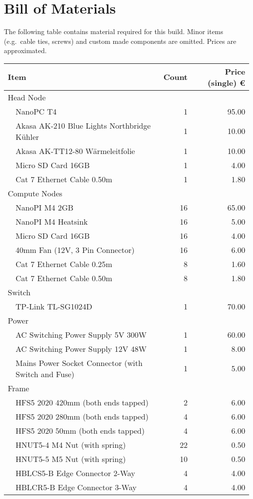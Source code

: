 \chapter{Bill of Materials}
\label{bom}

The following table contains material required for this build.
Minor items (e.g.\ cable ties, screws) and custom made components are omitted.
Prices are approximated.

\begin{center}
\begin{longtable}{llrr}
	\toprule
	\multicolumn{2}{l}{\textbf{Item}} & \textbf{Count} & \textbf{Price (single) €}\\

	\midrule
	\multicolumn{2}{l}{Head Node}\\
	& NanoPC T4 & 1 & 95.00\\
	& Akasa AK-210 Blue Lights Northbridge Kühler & 1 & 10.00\\
	& Akasa AK-TT12-80 Wärmeleitfolie & 1 & 10.00\\
	& Micro SD Card 16GB & 1 & 4.00\\
	& Cat 7 Ethernet Cable 0.50m & 1 & 1.80\\

	\midrule
	\multicolumn{2}{l}{Compute Nodes}\\
	& NanoPI M4 2GB & 16 & 65.00\\
	& NanoPI M4 Heatsink & 16 & 5.00\\
	& Micro SD Card 16GB & 16 & 4.00\\
	& 40mm Fan (12V, 3 Pin Connector) & 16 & 6.00\\
	& Cat 7 Ethernet Cable 0.25m & 8 & 1.60\\
	& Cat 7 Ethernet Cable 0.50m & 8 & 1.80\\

	\midrule
	\multicolumn{2}{l}{Switch}\\
	& TP-Link TL-SG1024D & 1 & 70.00\\

	\midrule
	\multicolumn{2}{l}{Power}\\
	& AC Switching Power Supply 5V 300W & 1 & 60.00\\
	& AC Switching Power Supply 12V 48W & 1 & 8.00\\
	& Mains Power Socket Connector (with Switch and Fuse) & 1 & 5.00\\

	\midrule
	\multicolumn{2}{l}{Frame}\\
	& HFS5 2020 420mm (both ends tapped) & 2 & 6.00\\
	& HFS5 2020 280mm (both ends tapped) & 4 & 6.00\\
	& HFS5 2020 50mm (both ends tapped) & 4 & 6.00\\
	& HNUT5-4 M4 Nut (with spring) & 22 & 0.50\\
	& HNUT5-5 M5 Nut (with spring) & 10 & 0.50\\
	& HBLCS5-B Edge Connector 2-Way & 4 & 4.00\\
	& HBLCR5-B Edge Connector 3-Way & 4 & 4.00\\


\end{longtable}
\end{center}
